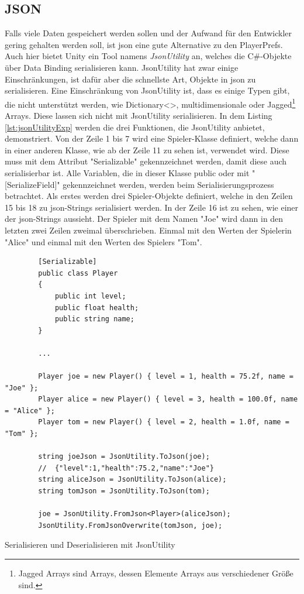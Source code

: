 \subsection{JSON}
Falls viele Daten gespeichert werden sollen und der Aufwand für den Entwickler gering gehalten werden soll, ist \ac{json} eine gute Alternative zu den PlayerPrefs. Auch hier bietet Unity ein Tool namens \textit{JsonUtility} an, welches die C\#-Objekte über Data Binding serialisieren kann. JsonUtility hat zwar einige Einschränkungen, ist dafür aber die schnellste Art, Objekte in \ac{json} zu serialisieren. Eine Einschränkung von JsonUtility ist, dass es einige Typen gibt, die nicht unterstützt werden, wie Dictionary<>, multidimensionale oder Jagged\footnote{Jagged Arrays sind Arrays, dessen Elemente Arrays aus verschiedener Größe sind.\cite{microsoftVerzweigteArrays}} Arrays. Diese lassen sich nicht mit JsonUtility serialisieren. In dem Listing \ref{lst:jsonUtilityExp} werden die drei Funktionen, die JsonUtility anbietet, demonstriert. Von der Zeile 1 bis 7 wird eine Spieler-Klasse definiert, welche dann in einer anderen Klasse, wie ab der Zeile 11 zu sehen ist, verwendet wird. Diese muss mit dem Attribut "Serializable" gekennzeichnet werden, damit diese auch serialisierbar ist. Alle Variablen, die in dieser Klasse public oder mit "[SerializeField]" gekennzeichnet werden, werden beim Serialisierungsprozess betrachtet. Als erstes werden drei Spieler-Objekte definiert, welche in den Zeilen 15 bis 18 zu \ac{json}-Strings serialisiert werden. In der Zeile 16 ist zu sehen, wie einer der \ac{json}-Strings aussieht. Der Spieler mit dem Namen "Joe" wird dann in den letzten zwei Zeilen zweimal überschrieben. Einmal mit den Werten der Spielerin "Alice" und einmal mit den Werten des Spielers "Tom".\cite{unityJsonUtility}\cite{unitySerializationRules} 

\begin{listing}[htp]
    \begin{verbatim} 
        [Serializable]
        public class Player
        {
            public int level;
            public float health;
            public string name;
        }

        ...
        
        Player joe = new Player() { level = 1, health = 75.2f, name = "Joe" };
        Player alice = new Player() { level = 3, health = 100.0f, name = "Alice" };
        Player tom = new Player() { level = 2, health = 1.0f, name = "Tom" };

        string joeJson = JsonUtility.ToJson(joe);
        //  {"level":1,"health":75.2,"name":"Joe"}
        string aliceJson = JsonUtility.ToJson(alice);
        string tomJson = JsonUtility.ToJson(tom);

        joe = JsonUtility.FromJson<Player>(aliceJson);
        JsonUtility.FromJsonOverwrite(tomJson, joe);
    \end{verbatim}
    \caption{Serialisieren und Deserialisieren mit JsonUtility}
    \label{lst:jsonUtilityExp}
\end{listing}

